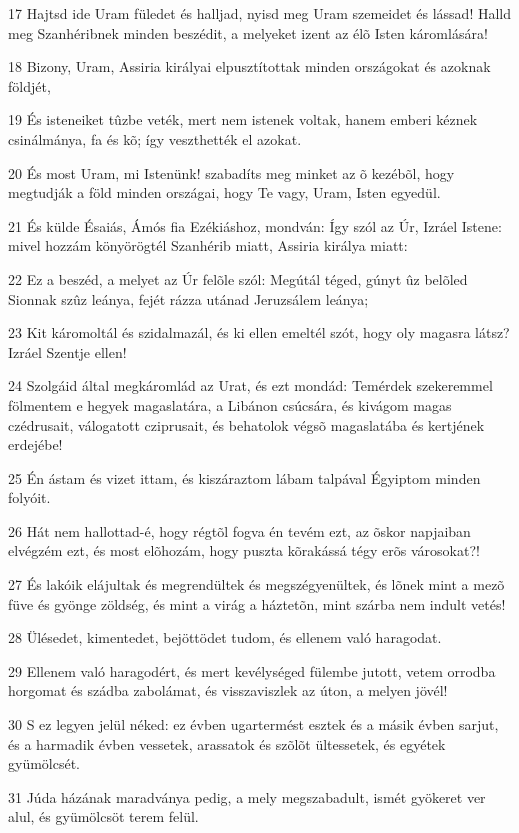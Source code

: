 \par 17 Hajtsd ide Uram füledet és halljad, nyisd meg Uram szemeidet és lássad! Halld meg Szanhéribnek minden beszédit, a melyeket izent az élõ Isten káromlására!
\par 18 Bizony, Uram, Assiria királyai elpusztítottak minden országokat és azoknak földjét,
\par 19 És isteneiket tûzbe veték, mert nem istenek voltak, hanem emberi kéznek csinálmánya, fa és kõ; így veszthették el azokat.
\par 20 És most Uram, mi Istenünk! szabadíts meg minket az õ kezébõl, hogy megtudják a föld minden országai, hogy Te vagy, Uram, Isten egyedül.
\par 21 És külde Ésaiás, Ámós fia Ezékiáshoz, mondván: Így szól az Úr, Izráel Istene: mivel hozzám könyörögtél Szanhérib miatt, Assiria királya miatt:
\par 22 Ez a beszéd, a melyet az Úr felõle szól: Megútál téged, gúnyt ûz belõled Sionnak szûz leánya, fejét rázza utánad Jeruzsálem leánya;
\par 23 Kit káromoltál és szidalmazál, és ki ellen emeltél szót, hogy oly magasra látsz? Izráel Szentje ellen!
\par 24 Szolgáid által megkáromlád az Urat, és ezt mondád: Temérdek szekeremmel fölmentem e hegyek magaslatára, a Libánon csúcsára, és kivágom magas czédrusait, válogatott cziprusait, és behatolok végsõ magaslatába és kertjének erdejébe!
\par 25 Én ástam és vizet ittam, és kiszáraztom lábam talpával Égyiptom minden folyóit.
\par 26 Hát nem hallottad-é, hogy régtõl fogva én tevém ezt, az õskor napjaiban elvégzém ezt, és most elõhozám, hogy puszta kõrakássá tégy erõs városokat?!
\par 27 És lakóik elájultak és megrendültek és megszégyenültek, és lõnek mint a mezõ füve és gyönge zöldség, és mint a virág a háztetõn, mint szárba nem indult vetés!
\par 28 Ülésedet, kimentedet, bejöttödet tudom, és ellenem való haragodat.
\par 29 Ellenem való haragodért, és mert kevélységed fülembe jutott, vetem orrodba horgomat és szádba zabolámat, és visszaviszlek az úton, a melyen jövél!
\par 30 S ez legyen jelül néked: ez évben ugartermést esztek és a másik évben sarjut, és a harmadik évben vessetek, arassatok és szõlõt ültessetek, és egyétek gyümölcsét.
\par 31 Júda házának maradványa pedig, a mely megszabadult, ismét gyökeret ver alul, és gyümölcsöt terem felül.

